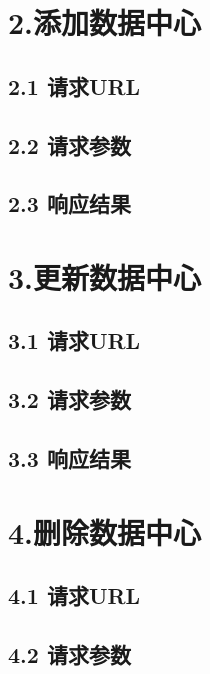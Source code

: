 \documentclass[letterpaper,10pt,english]{sphinxmanual}
\begin{document}
\section{2.添加数据中心}
\label{datacenter:id5}

\subsection{2.1 请求URL}
\label{datacenter:id6}

\subsection{2.2 请求参数}
\label{datacenter:id7}

\subsection{2.3 响应结果}
\label{datacenter:id8}

\section{3.更新数据中心}
\label{datacenter:id9}

\subsection{3.1 请求URL}
\label{datacenter:id10}

\subsection{3.2 请求参数}
\label{datacenter:id11}

\subsection{3.3 响应结果}
\label{datacenter:id12}

\section{4.删除数据中心}
\label{datacenter:id13}

\subsection{4.1 请求URL}
\label{datacenter:id14}

\subsection{4.2 请求参数}
\label{datacenter:id15}
\end{document}
